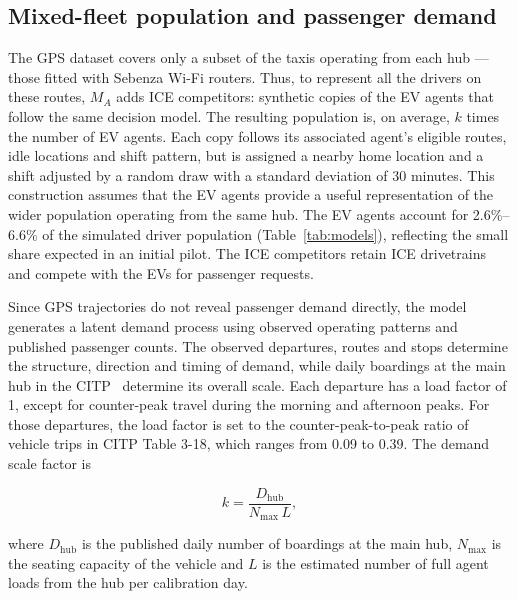 \documentclass{elsarticle}
\newcommand{\MA}{\ensuremath{M_A}}
\begin{document}
\subsection{Mixed-fleet population and passenger demand}
\label{sec:demand}

The GPS dataset covers only a subset of the taxis operating from each hub --- those fitted with Sebenza Wi-Fi routers. Thus, to represent all the drivers on these routes, \(\MA\) adds ICE competitors: synthetic copies of the EV agents that follow the same decision model. The resulting population is, on average, \(k\) times the number of EV agents. Each copy follows its associated agent's eligible routes, idle locations and shift pattern, but is assigned a nearby home location and a shift adjusted by a random draw with a standard deviation of 30 minutes. This construction assumes that the EV agents provide a useful representation of the wider population operating from the same hub. The EV agents account for 2.6\%--6.6\% of the simulated driver population (Table~\ref{tab:models}), reflecting the small share expected in an initial pilot. The ICE competitors retain ICE drivetrains and compete with the EVs for passenger requests.

Since GPS trajectories do not reveal passenger demand directly, the model generates a latent demand process using observed operating patterns and published passenger counts. The observed departures, routes and stops determine the structure, direction and timing of demand, while daily boardings at the main hub in the CITP~\cite{coct2023_citp} determine its overall scale. Each departure has a load factor of 1, except for counter-peak travel during the morning and afternoon peaks. For those departures, the load factor is set to the counter-peak-to-peak ratio of vehicle trips in CITP Table 3-18, which ranges from 0.09 to 0.39. The demand scale factor is

\begin{equation}
    k = \frac{D_\mathrm{hub}}{N_{\text{max}}\,L},
\end{equation}

\noindent where \(D_\mathrm{hub}\) is the published daily number of boardings at the main hub, \(N_{\text{max}}\) is the seating capacity of the vehicle and \(L\) is the estimated number of full agent loads from the hub per calibration day.
\end{document}
